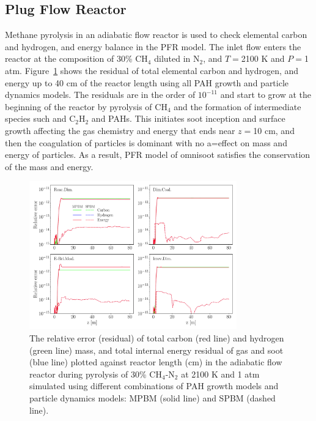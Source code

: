 \subsection{Plug Flow Reactor}
Methane pyrolysis in an adiabatic flow reactor is used to check elemental carbon and hydrogen, and energy balance in the PFR model. The inlet flow enters the reactor at the composition of 30\% $\mathrm{CH_4}$ diluted in $\mathrm{N_2}$, and $T=$2100 K and $P=$1 atm. Figure~\ref{fig:pfrvalid} shows the residual of total elemental carbon and hydrogen, and energy up to 40 cm of the reactor length using all PAH growth and particle dynamics models. The residuals are in the order of $10^{-11}$ and start to grow at the beginning of the reactor by pyrolysis of $\mathrm{CH_4}$ and the formation of intermediate species such and $\mathrm{C_2H_2}$ and PAHs. This initiates soot inception and surface growth affecting the gas chemistry and energy that ends near $z=$10 cm, and then the coagulation of particles is dominant with no a=effect on mass and energy of particles. As a result, PFR model of omnisoot satisfies the conservation of the mass and energy.


\begin{figure}[H]
	\centering
	\includegraphics[width=0.8\textwidth]{Figures/Results/Validation/PFR/relerr_pfr.pdf}
	\caption{The relative error (residual) of total carbon (red line) and hydrogen (green line) mass, and total internal energy residual of gas and soot (blue line) plotted against reactor length (cm) in the adiabatic flow reactor during pyrolysis of 30\% $\mathrm{CH_4}$-$\mathrm{N_2}$ at 2100 K and 1 atm simulated using different combinations of PAH growth models and particle dynamics models: MPBM (solid line) and SPBM (dashed line).}
	\label{fig:pfrvalid}
\end{figure}


